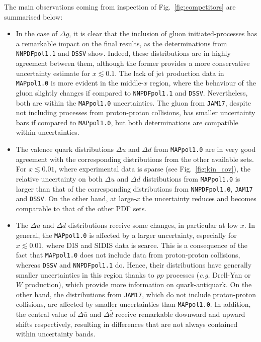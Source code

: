 The main observations coming from inspection of Fig.~\ref{fig:competitors} are summarised below:
\begin{itemize}
  \item In the case of $\Delta g$, it is clear that the inclusion of gluon initiated-processes has a remarkable impact on the final results, as the determinations from \texttt{NNPDFpol1.1} and \texttt{DSSV} show. Indeed, these distributions are in highly agreement between them, although the former provides a more conservative uncertainty estimate for $x \lesssim 0.1$. The lack of jet production data in \texttt{MAPpol1.0} is more evident in the middle-$x$ region, where the behaviour of the gluon slightly changes if compared to \texttt{NNPDFpol1.1} and \texttt{DSSV}. Nevertheless, both are within the \texttt{MAPpol1.0} uncertainties. The gluon from \texttt{JAM17}, despite not including processes from proton-proton collisions, has smaller uncertainty bars if compared to \texttt{MAPpol1.0}, but both determinations are compatible within uncertainties.
  \item The valence quark distributions $\Delta u$ and $\Delta d$ from \texttt{MAPpol1.0} are in very good agreement with the corresponding distributions from the other available sets. For $x \lesssim 0.01$, where experimental data is sparse (see Fig.~\ref{fig:kin_cov}), the relative uncertainty on both $\Delta u$ and $\Delta d$ distributions from \texttt{MAPpol1.0} is larger than that of the corresponding distributions from \texttt{NNPDFpol1.0}, \texttt{JAM17} and \texttt{DSSV}. On the other hand, at large-$x$ the uncertainty reduces and becomes comparable to that of the other PDF sets.
  \item The $\Delta \bar{u}$ and $\Delta \bar{d}$ distributions receive some changes, in particular at low $x$. In general, the \texttt{MAPpol1.0} is affected by a larger uncertainty, especially for $x \lesssim 0.01$, where DIS and SIDIS data is scarce. This is a consequence of the fact that \texttt{MAPpol1.0} does not include data from proton-proton collisions, whereas \texttt{DSSV} and \texttt{NNPDFpol1.1} do. Hence, their distributions have generally smaller uncertainties in this region thanks to $pp$ processes (\textit{e.g.} Drell-Yan or $W$ production), which provide more information on quark-antiquark. On the other hand, the distributions from \texttt{JAM17}, which do not include proton-proton collisions, are affected by smaller uncertainties than \texttt{MAPpol1.0}. In addition, the central value of $\Delta \bar{u}$ and $\Delta \bar{d}$ receive remarkable downward and upward shifts respectively, resulting in differences that are not always contained within uncertainty bands.

\end{itemize}
